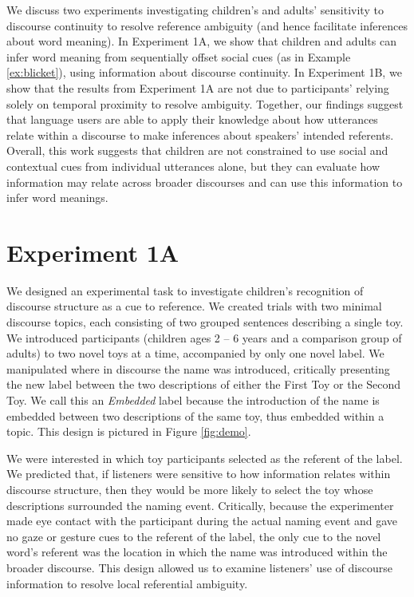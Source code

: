 \documentclass[man]{apa2}
\begin{document}
We discuss two experiments investigating children's and adults' sensitivity to discourse continuity to resolve reference ambiguity (and hence facilitate inferences about word meaning). In Experiment 1A, we show that children and adults can infer word meaning from sequentially offset social cues (as in Example \ref{ex:blicket}), using information about discourse continuity.  In Experiment 1B, we show that the results from Experiment 1A are not due to participants' relying solely on temporal proximity to resolve ambiguity.  Together, our findings suggest that language users are able to apply their knowledge about how utterances relate within a discourse to make inferences about speakers' intended referents.  Overall, this work suggests that children are not constrained to use social and contextual cues from individual utterances alone, but they can evaluate how information may relate across broader discourses and can use this information to infer word meanings.

\section{Experiment 1A}

We designed an experimental task to investigate children's recognition of discourse structure as a cue to reference. We created trials with two minimal discourse topics, each consisting of two grouped sentences describing a single toy.  We introduced participants (children ages 2 -- 6 years and a comparison group of adults) to two novel toys at a time, accompanied by only one novel label.  We manipulated where in discourse the name was introduced, critically presenting the new label between the two descriptions of either the First Toy or the Second Toy.  We call this an \emph{Embedded} label because the introduction of the name is embedded between two descriptions of the same toy, thus embedded within a topic.  This design is pictured in Figure \ref{fig:demo}.

We were interested in which toy participants selected as the referent of the label.  We predicted that, if listeners were sensitive to how information relates within discourse structure, then they would be more likely to select the toy whose descriptions surrounded the naming event.  Critically, because the experimenter made eye contact with the participant during the actual naming event and gave no gaze or gesture cues to the referent of the label, the only cue to the novel word's referent was the location in which the name was introduced within the broader discourse.  This design allowed us to examine listeners' use of discourse information to resolve local referential ambiguity.  
\end{document}
